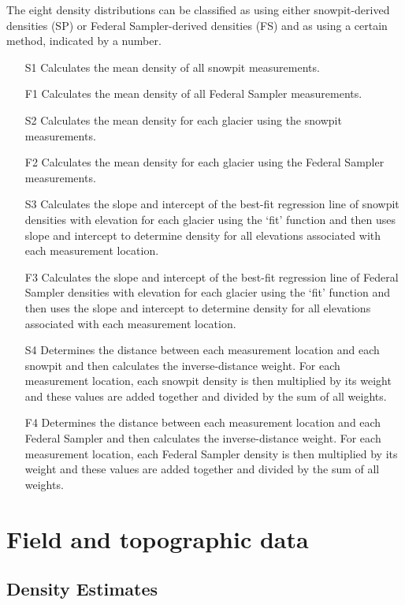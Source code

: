 \documentclass{sfuthesis}
\begin{document}
The eight density distributions can be classified as using either snowpit-derived densities (SP) or Federal Sampler-derived densities (FS) and as using a certain method, indicated by a number.
\begin{itemize}
	\item[S1] Calculates the mean density of all snowpit measurements.
	\item[F1] Calculates the mean density of all Federal Sampler measurements.
	\item[S2] Calculates the mean density for each glacier using the snowpit measurements. 
	\item[F2] Calculates the mean density for each glacier using the Federal Sampler measurements. 
	\item[S3] Calculates the slope and intercept of the best-fit regression line of snowpit densities with elevation for each glacier using the `fit' function and then uses slope and intercept to determine density for all elevations associated with each measurement location.
	\item[F3] Calculates the slope and intercept of the best-fit regression line of Federal Sampler densities with elevation for each glacier using the `fit' function and then uses the slope and intercept to determine density for all elevations associated with each measurement location.
	\item[S4] Determines the distance between each measurement location and each snowpit and then calculates the inverse-distance weight. For each measurement location, each snowpit density is then multiplied by its weight and these values are added together and divided by the sum of all weights. 
	\item[F4] Determines the distance between each measurement location and each Federal Sampler and then calculates the inverse-distance weight. For each measurement location, each Federal Sampler density is then multiplied by its weight and these values are added together and divided by the sum of all weights. 
	\end{itemize}



\chapter{Field and topographic data}

\section{Density Estimates}
\label{sec:density}
\end{document}

